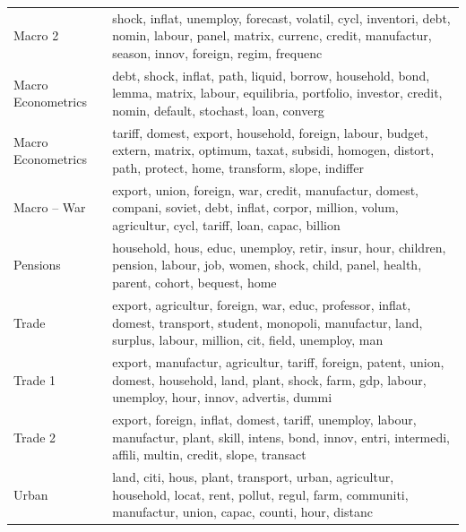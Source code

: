 \begin{table}[tb]
\begin{tabularx}{\hsize}{lY}
Macro 2 & shock, inflat, unemploy, forecast, volatil, cycl, inventori, debt, nomin, labour, panel, matrix, currenc, credit, manufactur, season, innov, foreign, regim, frequenc \\
Macro Econometrics & debt, shock, inflat, path, liquid, borrow, household, bond, lemma, matrix, labour, equilibria, portfolio, investor, credit, nomin, default, stochast, loan, converg \\
Macro Econometrics & tariff, domest, export, household, foreign, labour, budget, extern, matrix, optimum, taxat, subsidi, homogen, distort, path, protect, home, transform, slope, indiffer \\
Macro – War & export, union, foreign, war, credit, manufactur, domest, compani, soviet, debt, inflat, corpor, million, volum, agricultur, cycl, tariff, loan, capac, billion \\
Pensions & household, hous, educ, unemploy, retir, insur, hour, children, pension, labour, job, women, shock, child, panel, health, parent, cohort, bequest, home \\
Trade & export, agricultur, foreign, war, educ, professor, inflat, domest, transport, student, monopoli, manufactur, land, surplus, labour, million, cit, field, unemploy, man \\
Trade 1 & export, manufactur, agricultur, tariff, foreign, patent, union, domest, household, land, plant, shock, farm, gdp, labour, unemploy, hour, innov, advertis, dummi \\
Trade 2 & export, foreign, inflat, domest, tariff, unemploy, labour, manufactur, plant, skill, intens, bond, innov, entri, intermedi, affili, multin, credit, slope, transact \\
Urban & land, citi, hous, plant, transport, urban, agricultur, household, locat, rent, pollut, regul, farm, communiti, manufactur, union, capac, counti, hour, distanc \\
\bottomrule
\end{tabularx}
\end{table}
